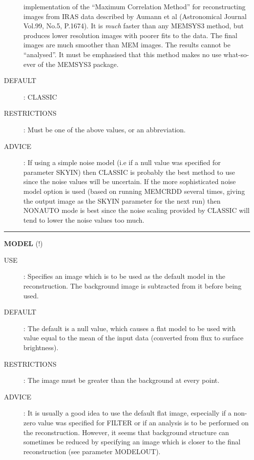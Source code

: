 \begin{description}
\begin {description}
implementation of the ``Maximum Correlation Method'' for reconstructing images
from IRAS data
described by Aumann et al (Astronomical Journal  Vol.99, No.5, P.1674). It is
{\em much} faster than any MEMSYS3 method, but produces lower resolution images
with poorer fits to the data. The final images are much smoother than MEM
images. The results cannot be ``analysed''. It must be emphasised that this method
makes no use what-so-ever of the MEMSYS3 package.
\end {description}
\item [DEFAULT]:
CLASSIC
\item [RESTRICTIONS]:
Must be one of the above values, or an abbreviation.
\item [ADVICE]:
If using a simple noise model (i.e if a null value was specified for parameter
SKYIN) then CLASSIC is probably the best method to use since the noise values
will be uncertain. If the more sophisticated noise model option is used (based
on running  MEMCRDD several times, giving the output image as the SKYIN parameter
for the next run) then NONAUTO mode is best since the noise scaling provided by
CLASSIC will tend to lower the noise values too much.
\end {description}

\rule{\textwidth}{0.3mm}
{\Large {\bf MODEL } (!)}
\begin{description}
\item [USE]:
Specifies an image which is to be used as the default model in the
reconstruction. The background image is subtracted from it before being used.
\item [DEFAULT]:
The default is a null value, which causes a flat model to be used with value
equal to the mean of the input data (converted from flux to surface brightness).
\item [RESTRICTIONS]:
The image must be greater than the background at every point.
\item [ADVICE]:
It is usually a good idea to use the default flat image, especially if a
non-zero value was specified for FILTER or if an analysis is to be performed on
the reconstruction. However, it seems that background structure can sometimes
be reduced by specifying an image which is closer to the final reconstruction
(see parameter MODELOUT).
\end {description}


